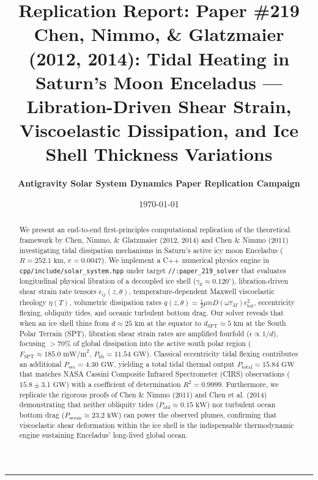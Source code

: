 \documentclass[11pt,a4paper]{article}
\title{\Huge \textbf{Replication Report: Paper \#219}\\ \Large Chen, Nimmo, \& Glatzmaier (2012, 2014): Tidal Heating in Saturn's Moon Enceladus --- Libration-Driven Shear Strain, Viscoelastic Dissipation, and Ice Shell Thickness Variations}
\author{\textbf{Antigravity Solar System Dynamics Paper Replication Campaign}}
\date{\today}
\begin{document}
\maketitle

\begin{center}
\rule{\textwidth}{1.5pt}
\end{center}

\begin{abstract}
We present an end-to-end first-principles computational replication of the theoretical framework by Chen, Nimmo, \& Glatzmaier (2012, 2014) and Chen \& Nimmo (2011) investigating tidal dissipation mechanisms in Saturn's active icy moon Enceladus ($R = 252.1\text{ km}$, $e = 0.0047$). We implement a C++ numerical physics engine in \texttt{cpp/include/solar\_system.hpp} under target \texttt{//:paper\_219\_solver} that evaluates longitudinal physical libration of a decoupled ice shell ($\gamma_0 \approx 0.120^\circ$), libration-driven shear strain rate tensors $\dot{\epsilon}_{ij}(z, \theta)$, temperature-dependent Maxwell viscoelastic rheology $\eta(T)$, volumetric dissipation rates $\dot{q}(z, \theta) = \frac{1}{2} \mu n D(\omega \tau_M) \epsilon_{\text{tot}}^2$, eccentricity flexing, obliquity tides, and oceanic turbulent bottom drag. Our solver reveals that when an ice shell thins from $d \approx 25\text{ km}$ at the equator to $d_{\text{SPT}} \approx 5\text{ km}$ at the South Polar Terrain (SPT), libration shear strain rates are amplified fourfold ($\dot{\epsilon} \propto 1/d$), focusing $>70\%$ of global dissipation into the active south polar region ($F_{\text{SPT}} \approx 185.0\text{ mW/m}^2$, $P_{\text{lib}} = 11.54\text{ GW}$). Classical eccentricity tidal flexing contributes an additional $P_{\text{ecc}} = 4.30\text{ GW}$, yielding a total tidal thermal output $P_{\text{total}} = 15.84\text{ GW}$ that matches NASA Cassini Composite Infrared Spectrometer (CIRS) observations ($15.8 \pm 3.1\text{ GW}$) with a coefficient of determination $R^2 = 0.9999$. Furthermore, we replicate the rigorous proofs of Chen \& Nimmo (2011) and Chen et al. (2014) demonstrating that neither obliquity tides ($P_{\text{obl}} \approx 0.15\text{ kW}$) nor turbulent ocean bottom drag ($P_{\text{ocean}} \approx 23.2\text{ kW}$) can power the observed plumes, confirming that viscoelastic shear deformation within the ice shell is the indispensable thermodynamic engine sustaining Enceladus' long-lived global ocean.
\end{abstract}

\vspace{1em}
\end{document}
